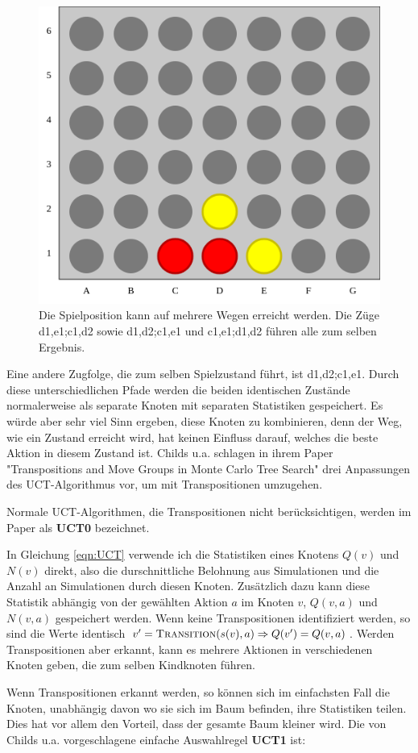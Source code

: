 \begin{figure}[hbt!]
	\centering
	\includegraphics[width=0.6\linewidth]{c4_transpos}
	\caption[Transposition in Vier Gewinnt]{Die Spielposition kann auf mehrere Wegen erreicht werden. Die Züge d1,e1;c1,d2 sowie d1,d2;c1,e1 und c1,e1;d1,d2 führen alle zum selben Ergebnis.}
	\label{fig:c4transpos}
\end{figure}

Eine andere Zugfolge, die zum selben Spielzustand führt, ist d1,d2;c1,e1. Durch diese unterschiedlichen Pfade werden die beiden identischen Zustände normalerweise als separate Knoten mit separaten Statistiken gespeichert. Es würde aber sehr viel Sinn ergeben, diese Knoten zu kombinieren, denn der Weg, wie ein Zustand erreicht wird, hat keinen Einfluss darauf, welches die beste Aktion in diesem Zustand ist. Childs u.a. schlagen in ihrem Paper "Transpositions and Move Groups in Monte Carlo Tree Search"\autocite[\ppno~390\psq]{childsTranspositionsMoveGroups2008} drei Anpassungen des UCT-Algorithmus vor, um mit Transpositionen umzugehen. 

Normale UCT-Algorithmen, die Transpositionen nicht berücksichtigen, werden im Paper als \textbf{UCT0} bezeichnet. 

In Gleichung \ref{eqn:UCT} verwende ich die Statistiken eines Knotens $Q(v)$ und $N(v)$ direkt, also die durschnittliche Belohnung aus Simulationen und die Anzahl an Simulationen durch diesen Knoten. Zusätzlich dazu kann diese Statistik abhängig von der gewählten Aktion $a$ im Knoten $v$, $Q(v,a)$ und $N(v,a)$ gespeichert werden. Wenn keine Transpositionen identifiziert werden, so sind die Werte identisch $v^\prime = \textsc{Transition}(s(v),a) \Rightarrow Q(v^\prime) = Q(v,a)$. Werden Transpositionen aber erkannt, kann es mehrere Aktionen in verschiedenen Knoten geben, die zum selben Kindknoten führen.

Wenn Transpositionen erkannt werden, so können sich im einfachsten Fall die Knoten, unabhängig davon wo sie sich im Baum befinden, ihre Statistiken teilen. Dies hat vor allem den Vorteil, dass der gesamte Baum kleiner wird. Die von Childs u.a. vorgeschlagene einfache Auswahlregel \textbf{UCT1} ist:

